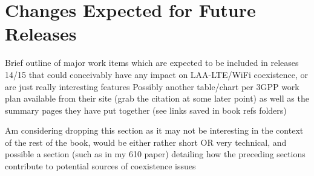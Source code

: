 \section {Changes Expected for Future Releases}
\label{fut-chnge}
Brief outline of major work items which are expected to be included in releases 14/15 that could conceivably have any impact on LAA-LTE/WiFi coexistence, or are just really interesting features 
Possibly another table/chart per 3GPP work plan available from their site (grab the citation at some later point) as well as the summary pages they have put together (see links saved in book refs folders)

Am considering dropping this section as it may not be interesting in the context of the rest of the book, would be either rather short OR very technical, and possible a section (such as in my 610 paper) detailing how the preceding sections contribute to potential sources of coexistence issues
